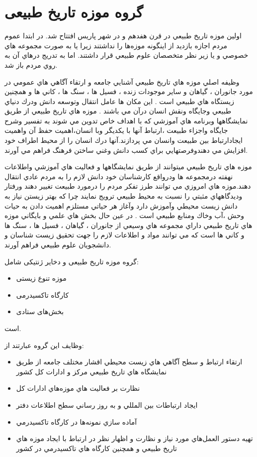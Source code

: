 \section{گروه موزه تاریخ طبیعی ~\cite{naturalgroup}}
اولين موزه تاريخ طبيعي در قرن
هفدهم و در شهر پاريس افتتاح شد.
در ابتدا عموم مردم اجازه بازديد از اينگونه موزه‌ها را نداشتند زيرا يا به
صورت مجموعه هاي خصوصي و يا زير نظر متخصصان علوم طبيعي قرار داشتند. اما به تدريج درهاي آن به
روي مردم باز شد.

وظيفه اصلي موزه هاي تاريخ طبيعي آشنايي جامعه و ارتقاء آگاهي هاي عمومي در مورد جانوران ، گياهان و 
ساير موجودات زنده ، فسيل ها ، سنگ ها ، كاني ها و همچنين زيستگاه هاي طبيعي است . اين مكان ها 
عامل انتقال وتوسعه دانش ودرك دنياي طبيعي وجايگاه ونقش انسان درآن مي باشند . موزه هاي تاريخ طبيعي
از طريق نمايشگاهها وبرنامه هاي آموزشي كه با اهداف خاص تدوين مي شوند به تفسير وشرح جايگاه واجزاء
طبيعت ،ارتباط آنها با يكديگر وبا انسان،اهميت حفظ آن واهميت ايجادارتباط بين طبيعت وانسان مي
پردازند.آنها درك انسان را از محيط اطراف خود افزايش مي دهندوفرصتهايي براي كسب دانش وغني ساختن
فرهنگ فراهم مي آورند.

موزه هاي تاريخ طبيعي ميتوانند از طريق نمايشگاهها و فعاليت هاي آموزشي واطلاعات
نهفته درمجموعه ها ودرواقع كارشناسان خود دانش لازم را به مردم عادي انتقال دهند.موزه هاي امروزي مي
توانند طرز تفكر مردم را درمورد طبيعت تغيير دهند ورفتار وديدگاههاي مثبتي را نسبت به محيط طبيعي
ترويج نمايند چرا كه بهتر زيستن نياز به دانش زيست محيطي وآموزش دارد وآغاز هر حياتي مستلزم اهميت
دادن به حيات وحش ،آب وخاك ومنابع طبيعي است . در عين حال بخش هاي علمي و بايگاني موزه هاي تاريخ
طبيعي داراي مجموعه هاي وسيعي از جانوران ، گياهان ، فسيل ها ، سنگ ها و كاني ها است كه مي توانند مواد
و اطلاعات لازم را جهت تحقيق زيست شناسان و دانشجويان علوم طبيعي فراهم آورند.



گروه موزه تاریخ طبیعی و دخایر ژنتیکی شامل:
\begin{itemize}
    \item موزه تنوع زیستی
    \item کارگاه تاکسیدرمی
    \item بخش‌های ستادی
\end{itemize}
است.

وظایف این گروه عبارتند از:

\begin{itemize}
    \item ارتقاء ارتباط و سطح آگاهي هاي زيست محيطي اقشار مختلف جامعه از طريق نمايشگاه
    هاي تاريخ طبيعي مركز و ادارات كل كشور
    \item نظارت بر فعاليت هاي موزه‌هاي ادارات كل
    \item ايجاد ارتباطات بين المللي و به روز رساني سطح اطلاعات دفتر
    \item آماده سازي نمونه‌ها در كارگاه تاكسيدرمي
    \item تهيه دستور العمل‌هاي مورد نياز و نظارت و اظهار نظر در ارتباط با ايجاد موزه هاي تاريخ
    طبيعي و همچنين كارگاه هاي تاكسيدرمي در كشور
\end{itemize}

